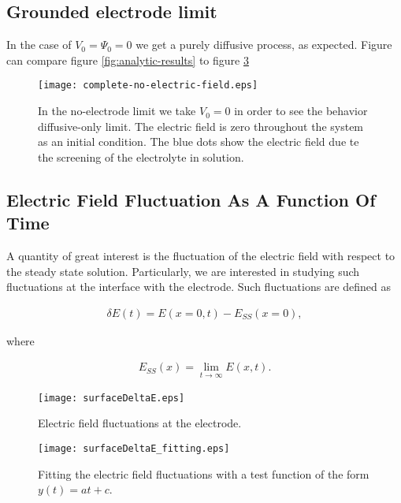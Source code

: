 \newpage
\subsection{Grounded electrode limit}

In the case of $V_0 = \Psi_0 = 0$ we get a purely diffusive process, as expected. Figure can compare figure \ref{fig:analytic-results} to figure \ref{fig:nernts-no-field}


\begin{figure}[htbp]
\centering
\texttt{[image: complete-no-electric-field.eps]}
\caption{In the no-electrode limit we take $V_0=0$ in order to see the behavior diffusive-only limit. The electric field is zero throughout the system as an initial condition. The blue dots show the electric field due te the screening of the electrolyte in solution. }
\label{fig:nernts-no-field}
\end{figure}


\newpage
\subsection{Electric Field Fluctuation As A Function Of Time}


A quantity of great interest is the fluctuation of the electric field with respect to the steady state solution. Particularly, we are interested in studying such fluctuations at the interface with the electrode. Such fluctuations are defined as

\begin{align}
	\delta E(t) = E(x=0, t) - E_{SS}(x=0), 
\end{align}

where 

\begin{align}
	E_{SS}(x) = \lim_{t\rightarrow\infty} E(x,t).
\end{align}



\begin{figure}[htbp]
\centering
\texttt{[image: surfaceDeltaE.eps]}
\caption{Electric field fluctuations at the electrode.}
\label{fig:nernts-no-field}
\end{figure}

\begin{figure}[htbp]
\centering
\texttt{[image: surfaceDeltaE\_fitting.eps]}
\caption{Fitting the electric field fluctuations with a test function of the form $y(t) = a t + c$.}
\label{fig:nernts-no-field}
\end{figure}



\newpage



